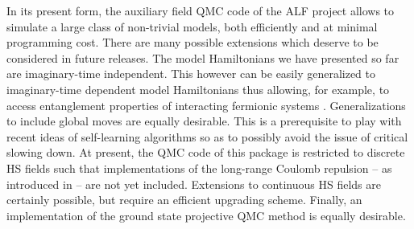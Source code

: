 
In its present form, the  auxiliary field QMC code of the ALF project  allows to simulate a large class of non-trivial models, both efficiently and at minimal  programming cost.  There are many possible extensions which deserve to be considered in future releases.    The model Hamiltonians we have presented so far are imaginary-time independent. This however can be easily generalized  to imaginary-time dependent model Hamiltonians thus allowing, for example, to access  entanglement properties of interacting fermionic systems \cite{Broecker14,Assaad14,Assaad13a,Assaad15}. Generalizations to include global moves are equally desirable. This is a prerequisite to  play with recent ideas of self-learning algorithms  \cite{Xu16a} so as to  possibly avoid the issue of critical slowing down.  At present, the QMC code of this package is  restricted to discrete HS fields such that  implementations  of  the long-range Coulomb repulsion -- as introduced in \cite{Hohenadler14,Ulybyshev2013,Brower12} -- are not yet included.   Extensions  to  continuous HS fields are certainly possible, but require an efficient upgrading scheme. Finally,  an implementation of the  ground state projective QMC method   is equally desirable.
